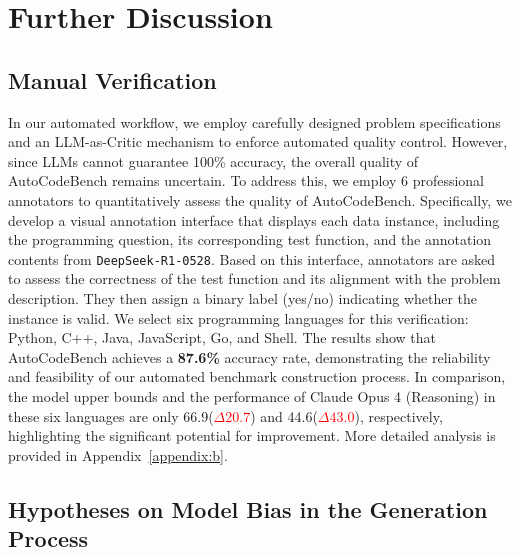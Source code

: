 \section{Further Discussion}

\subsection{Manual Verification}

In our automated workflow, we employ carefully designed problem specifications and an LLM-as-Critic mechanism to enforce automated quality control. However, since LLMs cannot guarantee 100\% accuracy, the overall quality of AutoCodeBench remains uncertain. To address this, we employ 6 professional annotators to quantitatively assess the quality of AutoCodeBench. Specifically, we develop a visual annotation interface that displays each data instance, including the programming question, its corresponding test function, and the annotation contents from \texttt{DeepSeek-R1-0528}. Based on this interface, annotators are asked to assess the correctness of the test function and its alignment with the problem description. They then assign a binary label (yes/no) indicating whether the instance is valid. We select six programming languages for this verification: Python, C++, Java, JavaScript, Go, and Shell. The results show that AutoCodeBench achieves a \textbf{87.6\%} accuracy rate, demonstrating the reliability and feasibility of our automated benchmark construction process. In comparison, the model upper bounds and the performance of Claude Opus 4 (Reasoning) in these six languages are only 66.9(\textcolor{red}{$\Delta20.7$}) and 44.6(\textcolor{red}{$\Delta43.0$}), respectively, highlighting the significant potential for improvement. More detailed analysis is provided in Appendix~\ref{appendix:b}.



\subsection{Hypotheses on Model Bias in the Generation Process}




